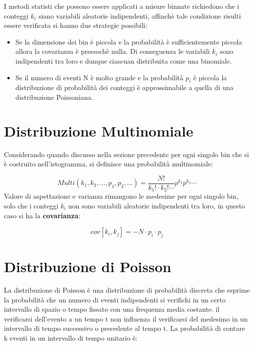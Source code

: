 I metodi statisti che possono essere applicati a misure binnate richiedono che i conteggi $k_{i}$ siano variabili aleatorie indipendenti, affinch\`{e} tale condizione risulti essere verificata si hanno due strategie possibili:

\begin{itemize}
\item
\noindent Se la dimensione dei bin \`{e} piccola e la probabilit\`{a} \`{e} sufficientemente piccola allora la covarianza \`{e} pressoch\`{e} nulla. Di conseguenza le variabili $k_i$ sono indipendenti tra loro e dunque ciascuan distribuita come una binomiale.
\item
\noindent Se il numero di eventi N \`{e} molto grande e la probabilit\`{a} $p_i$ \`{e} piccola la distribuzione di probabilit\`{a} dei conteggi \`{e} approssimabile a quella di una distribuzione Poissoniana. 
\end{itemize}
\section{Distribuzione Multinomiale}

Considerando quando discusso nella sezione precedente per ogni singolo bin che si \`{e} costruito nell'istogramma, si definisce una probabilit\`{a} multinomiale:

\begin{equation}
	Multi(k_1,k_2,...,p_1,p_2,...) = \dfrac{N!}{k_1!\cdot k_2! \cdots}p^{k_{1}}p^{k_2}\cdots
\end{equation}
\newline
\noindent Valore di aspettazione e varianza rimangono le medesime per ogni singolo bin, solo che i conteggi $k_i$ non sono variabili aleatorie indipendenti tra loro, in questo caso si ha la \textbf{covarianza}:

\begin{equation}
	cov[k_i,k_j] = -N \cdot p_i \cdot p_j 
\end{equation}

\section{Distribuzione di Poisson}

La distribuzione di Poisson \`{e} una distribuzione di probabilit\`{a} discreta che esprime la probabilit\`{a} che un numero di eventi indipendenti si verifichi in un certo intervallo di spazio o tempo fissato con una frequenza media costante. il verificarsi dell'evento a un tempo t non influenza il verificarsi del medesimo in un intervallo di tempo successivo o precedente  al tempo t.
La probabilit\`{a} di contare k eventi in un intervallo di tempo unitario \`{e}:

